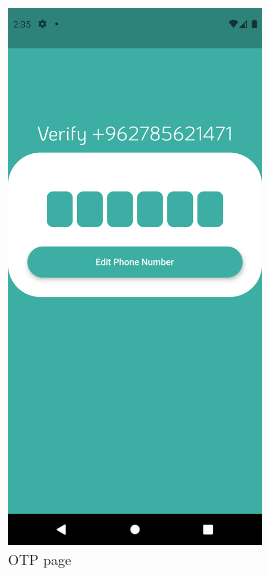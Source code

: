 \documentclass[12pt]{article}
\begin{document}
\begin{figure}[h!]
\centerline{\includegraphics[width=0.6\textwidth]{./Screenshots/8.PNG}}
  \caption{OTP page}
  \end{figure}
  
\end{document}
